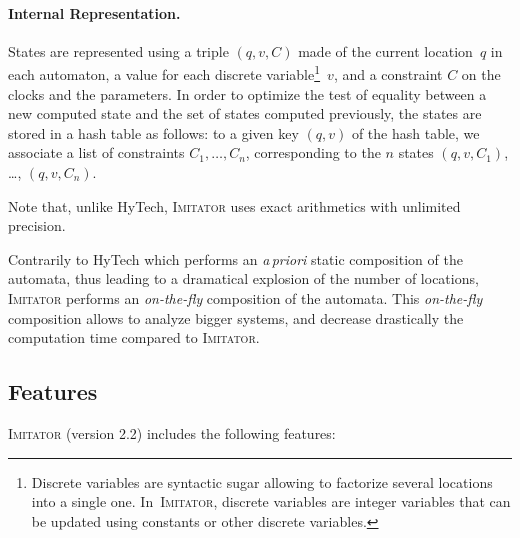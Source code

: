 \documentclass[a4paper,10pt]{article}
\newcommand{\hytech}{{\sc HyTech}}
\newcommand{\imitator}{\textsc{Imitator}}
\newcommand{\imitatorversion}{2.2}
\newcommand{\paragraphe}[1]{\paragraph{#1.}}
\begin{document}
\paragraphe{Internal Representation}
States are represented using a triple $(q, v, C)$ made of the current location~$q$ in each automaton, a value for each discrete variable\footnote{Discrete variables are syntactic sugar allowing to factorize several locations into a single one. In~\imitator{}, discrete variables are integer variables that can be updated using constants or other discrete variables.}~$v$, and a constraint $C$ on the clocks and the parameters.
In order to optimize the test of equality between a new computed state and the set of states computed previously, the states are stored in a hash table as follows:
to a given key $(q, v)$ of the hash table, we associate a list of constraints $C_1, \dots, C_n$, corresponding to the $n$ states $(q, v, C_1)$, \dots, $(q, v, C_n)$.

Note that, unlike \hytech{}, \imitator{} uses exact arithmetics with unlimited precision.

Contrarily to \hytech{} which performs an \emph{a\,priori} static composition of the automata, thus leading to a dramatical explosion of the number of locations, \imitator{} performs an \emph{on-the-fly} composition of the automata.
This \emph{on-the-fly} composition allows to analyze bigger systems, and decrease drastically the computation time compared to \imitator{}. %




\subsection{Features} \label{ss:features}

\imitator{} (version \imitatorversion{}) includes the following features:
\end{document}
